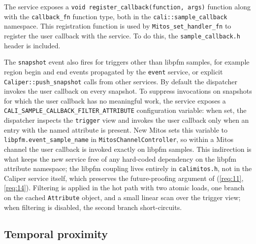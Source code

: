 The service exposes a \texttt{void register\_callback(function, args)} function along with the \texttt{callback\_fn} function type, both in the \texttt{cali::sample\_callback} namespace. This registration function is used by \texttt{Mitos\_set\_handler\_fn} to register the user callback with the service. To do this, the \texttt{sample\_callback.h} header is included.

The \texttt{snapshot} event also fires for triggers other than libpfm samples, for example region begin and end events propagated by the \texttt{event} service, or explicit \texttt{Caliper::push\_snapshot} calls from other services. By default the dispatcher invokes the user callback on every snapshot. To suppress invocations on snapshots for which the user callback has no meaningful work, the service exposes a \texttt{CALI\_SAMPLE\_CALLBACK\_FILTER\_ATTRIBUTE} configuration variable: when set, the dispatcher inspects the \texttt{trigger} view and invokes the user callback only when an entry with the named attribute is present. New Mitos sets this variable to \texttt{libpfm.event\_sample\_name} in \texttt{MitosChannelController}, so within a Mitos channel the user callback is invoked exactly on libpfm samples. This indirection is what keeps the new service free of any hard-coded dependency on the libpfm attribute namespace; the libpfm coupling lives entirely in \texttt{calimitos.h}, not in the Caliper service itself, which preserves the future-proofing argument of  (\ref{req:11}, \ref{req:14}). Filtering is applied in the hot path with two atomic loads, one branch on the cached \texttt{Attribute} object, and a small linear scan over the trigger view; when filtering is disabled, the second branch short-circuits.

\subsection{Temporal proximity}\label{subsec:sample-callback-temporal}

